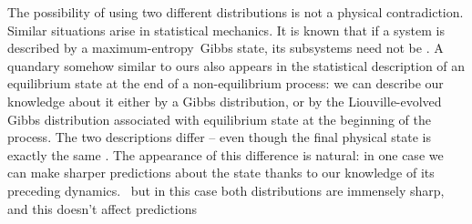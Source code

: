 \documentclass{article}
\theoremstyle{remark}
\theoremstyle{innote}
\newcommand*{\citep}{\parencites}
\renewcommand*{\cite}{\citep}
\renewcommand*{\|}{\mathpunct{|}}%
\newcommand*{\p}{\mathrm{P}}%
\newcommand*{\sect}{\S}%
\newcommand*{\fig}{fig.}%
\newcommand*{\eg}{{e.g.}}
\newcommand*{\E}{\mathrm{E}}
\DeclarePairedDelimiter\expp{(}{)}
\newcommand*{\expe}{\E\expp}%
\theoremstyle{simple}
\newcommand*{\puzzle}{{\fontencoding{U}\fontfamily{fontawesometwo}\selectfont\symbol{225}}}
\newcommand{\mynote}[1]{ {\color{notecolour}\puzzle\ #1}}
\newcommand*{\widebar}[1]{{\mkern1.5mu\skew{2}\overline{\mkern-1.5mu#1\mkern-1.5mu}\mkern 1.5mu}}
\newcommand*{\sav}{\widebar} %
\newcommand*{\yxx}{x}%
\newcommand*{\yx}{\bm{\yxx}}%
\newcommand*{\yxs}{\sav{\yx}}%
\newcommand*{\yxxs}{\sav{\yx\yx}}%
\newcommand*{\yr}{\bm{r}}%
\newcommand*{\yrs}{\sav{\yr}}%
\newcommand*{\yH}{\varIota}
\newcommand*{\me}{maximum-entropy}
\begin{document}

The possibility of using two different distributions is
not a physical contradiction. Similar situations arise in statistical
mechanics. It is known that if a system is described by a \me\ Gibbs state,
its subsystems need not be \cite{maesetal1999}. A quandary somehow similar
to ours also appears in the statistical description of an equilibrium state
at the end of a non-equilibrium process: we can describe our knowledge
about it either by a Gibbs distribution, or by the Liouville-evolved Gibbs
distribution associated with equilibrium state at the beginning of the
process. The two descriptions differ -- even though the final physical
state is exactly the same \cite[\sect~4]{jaynes1985d_r1993}. The appearance
of this difference is natural: in one case we can make sharper predictions
about the state thanks to our knowledge of its preceding dynamics.
\mynote{but in this case both distributions are immensely sharp, and this
  doesn't affect predictions}
\end{document}

